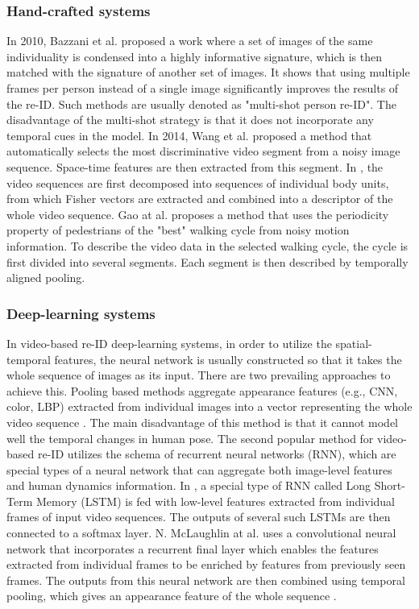 \subsubsection{Hand-crafted systems}
In 2010, Bazzani et al.\cite{multi_shot_person_reid} proposed a work where a set of images of the same individuality is condensed into a highly informative signature, which is then matched with the signature of another set of images. It shows that using multiple frames per person instead of a single image significantly improves the results of the re-ID. Such methods are usually denoted as "multi-shot person re-ID". The disadvantage of the multi-shot strategy is that it does not incorporate any temporal cues in the model. In 2014, Wang et al. \cite{video_ranking_re-id} proposed a method that automatically selects the most discriminative video segment from a noisy image sequence. Space-time features are then extracted from this segment. In \cite{fisher_composition_for_video_reid}, the video sequences are first decomposed into sequences of individual body units, from which Fisher vectors are extracted and combined into a descriptor of the whole video sequence. Gao at al. \cite{temporally_aligned_pooling} proposes a method that uses the periodicity property of pedestrians of the "best" walking cycle from noisy motion information. To describe the video data in the selected walking cycle, the cycle is first divided into several segments. Each segment is then described by temporally aligned pooling.  
\subsubsection{Deep-learning systems}
In video-based re-ID deep-learning systems, in order to utilize the spatial-temporal features, the neural network is usually constructed so that it takes the whole sequence of images as its input. There are two prevailing approaches to achieve this. Pooling based methods aggregate appearance features (e.g., CNN, color, LBP) extracted from individual images into a vector representing the whole video sequence \cite{MARS}. The main disadvantage of this method is that it cannot model well the temporal changes in human pose. The second popular method for video-based re-ID utilizes the schema of recurrent neural networks (RNN), which are special types of a neural network that can aggregate both image-level features and human dynamics information. In \cite{recurrent_feature_aggregation_lstm}, a special type of RNN called Long Short-Term Memory (LSTM) is fed with low-level features extracted from individual frames of input video sequences. The outputs of several such LSTMs are then connected to a softmax layer. N. McLaughlin at al.  \cite{pooling_with_RNN} uses a convolutional neural network that incorporates a recurrent final layer which enables the features extracted from individual frames to be enriched by features from previously seen frames. The outputs from this neural network are then combined using temporal pooling, which gives an appearance feature of the whole sequence  \cite{pooling_with_RNN}. 
